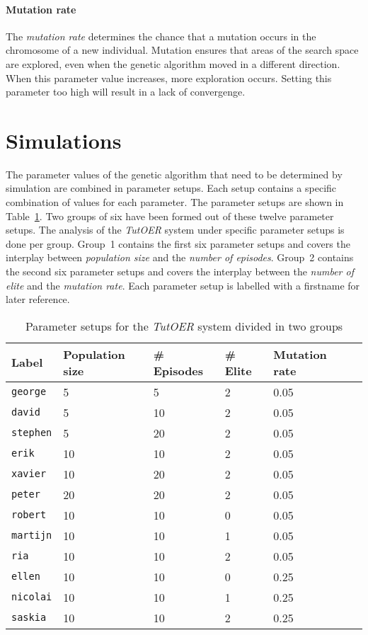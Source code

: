 \paragraph{Mutation rate} The \emph{mutation rate} determines the chance that a
mutation occurs in the chromosome of a new individual. Mutation ensures that
areas of the search space are explored, even when the genetic algorithm moved
in a different direction. When this parameter value increases, more exploration
occurs. Setting this parameter too high will result in a lack of convergenge.
\section{Simulations}
\label{sec:simulations_simulations}
The parameter values of the genetic algorithm that need to be determined by
simulation are combined in parameter setups. Each setup contains a specific
combination of values for each parameter. The parameter setups are shown in
Table~\ref{tab:simulation_setups}. Two groups of six have been formed out of
these twelve parameter setups. The analysis of the \emph{TutOER} system under
specific parameter setups is done per group. Group~1 contains the first six
parameter setups and covers the interplay between \emph{population size} and
the \emph{number of episodes}. Group~2 contains the second six parameter setups
and covers the interplay between the \emph{number of elite} and the
\emph{mutation rate}. Each parameter setup is labelled with a firstname for
later reference.\\
\begin{table}[h!]
	\centering
	\caption{Parameter setups for the \emph{TutOER} system divided in two groups}
	\label{tab:simulation_setups}
	\begin{tabular}{llllll}\hline
		\textbf{Label} & \textbf{Population size} & \textbf{\# Episodes}
		& \textbf{\# Elite} & \textbf{Mutation rate} \\\hline
		\texttt{george} & 5 & 5 & 2 & 0.05 \\
		\texttt{david} & 5 & 10 & 2 & 0.05 \\
		\texttt{stephen} & 5 & 20 & 2 & 0.05 \\
		\texttt{erik} & 10 & 10 & 2 & 0.05 \\
		\texttt{xavier} & 10 & 20 & 2 & 0.05 \\
		\texttt{peter} & 20 & 20 & 2 & 0.05 \\\hdashline
		\texttt{robert} & 10 & 10 & 0 & 0.05 \\
		\texttt{martijn} & 10 & 10 & 1 & 0.05 \\
		\texttt{ria} & 10 & 10 & 2 & 0.05 \\
		\texttt{ellen} & 10 & 10 & 0 & 0.25 \\
		\texttt{nicolai} & 10 & 10 & 1 & 0.25 \\
		\texttt{saskia} & 10 & 10 & 2 & 0.25 \\
	\end{tabular}
\end{table}\\
